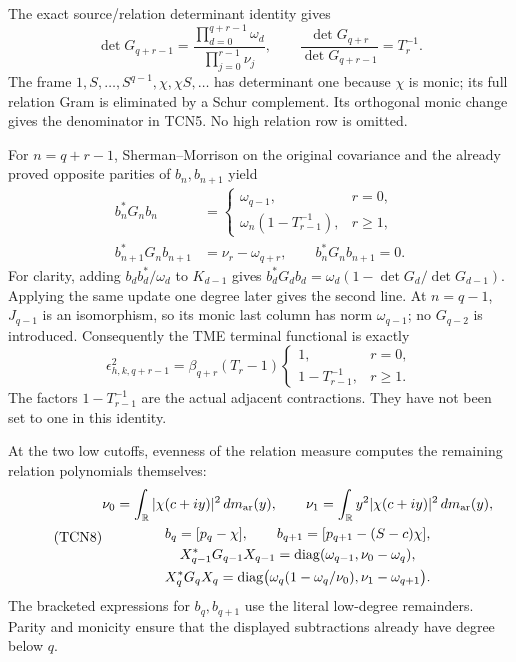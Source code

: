 \documentclass[11pt,a4paper]{article}
\begin{document}
The exact source/relation determinant identity gives
\begin{equation}\tag{TCN5}
 \det G_{q+r-1}
 =\frac{\prod_{d=0}^{q+r-1}\omega_d}{\prod_{j=0}^{r-1}\nu_j},
 \qquad
 \frac{\det G_{q+r}}{\det G_{q+r-1}}=T_r^{-1}.
\end{equation}
The frame $1,S,\ldots,S^{q-1},\chi,\chi S,\ldots$ has determinant
one because $\chi$ is monic; its full relation Gram is eliminated by
a Schur complement. Its orthogonal monic change gives the denominator
in TCN5. No high relation row is omitted.

For $n=q+r-1$, Sherman--Morrison on the original covariance and the
already proved opposite parities of $b_n,b_{n+1}$ yield
\begin{equation}\tag{TCN6}\label{tcn:energies}
 \boxed{\begin{aligned}
 b_n^*G_nb_n&=
 \begin{cases}\omega_{q-1},&r=0,\\
 \omega_n(1-T_{r-1}^{-1}),&r\ge1,
 \end{cases}\\
 b_{n+1}^*G_nb_{n+1}&=\nu_r-\omega_{q+r},\qquad
 b_n^*G_nb_{n+1}=0.
 \end{aligned}}
\end{equation}
For clarity, adding $b_db_d^*/\omega_d$ to $K_{d-1}$ gives
$b_d^*G_db_d=\omega_d(1-\det G_d/\det G_{d-1})$.
Applying the same update one degree later gives the second line.
At $n=q-1$, $J_{q-1}$ is an isomorphism, so its monic last column
has norm $\omega_{q-1}$; no $G_{q-2}$ is introduced.
Consequently the TME terminal functional is exactly
\begin{equation}\tag{TCN7}\label{tcn:exactallowance}
 \boxed{\epsilon_{h,k,q+r-1}^2=
 \beta_{q+r}(T_r-1)
 \begin{cases}1,&r=0,\\1-T_{r-1}^{-1},&r\ge1.\end{cases}}
\end{equation}
The factors $1-T_{r-1}^{-1}$ are the actual adjacent contractions.
They have not been set to one in this identity.

At the two low cutoffs, evenness of the relation measure computes the
remaining relation polynomials themselves:
\begin{equation}\tag{TCN8}
 \begin{gathered}
 \nu_0=\int_{\mathbb R}|\chi(c+iy)|^2\,dm_{\mathrm{ar}}(y),\qquad
 \nu_1=\int_{\mathbb R}y^2|\chi(c+iy)|^2\,dm_{\mathrm{ar}}(y),\\
 b_q=[p_q-\chi],\qquad b_{q+1}=[p_{q+1}-(S-c)\chi],\\
 X_{q-1}^*G_{q-1}X_{q-1}
   =\operatorname{diag}(\omega_{q-1},\nu_0-\omega_q),\\
 X_q^*G_qX_q
   =\operatorname{diag}\bigl(\omega_q(1-\omega_q/\nu_0),
                              \nu_1-\omega_{q+1}\bigr).
 \end{gathered}
\end{equation}
The bracketed expressions for $b_q,b_{q+1}$ use the literal
low-degree remainders. Parity and monicity ensure that the displayed
subtractions already have degree below $q$.
\end{document}
